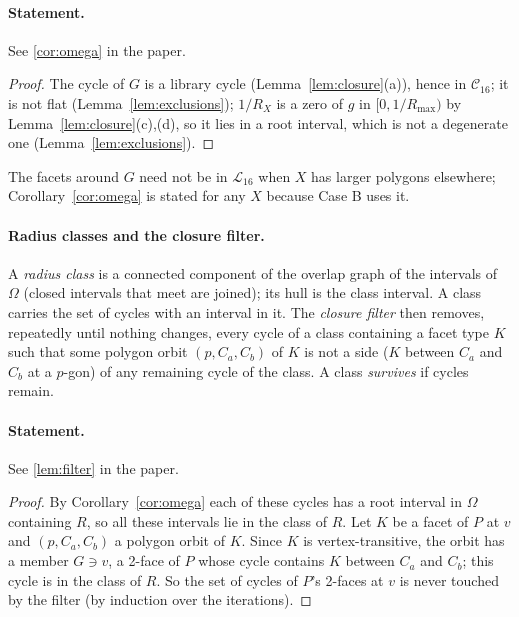 \documentclass[11pt]{article}
\theoremstyle{definition}
\theoremstyle{remark}
\begin{document}
\paragraph{Statement.} See \ref{cor:omega} in the paper.

\begin{proof}
The cycle of $G$ is a library cycle (Lemma~\ref{lem:closure}(a)), hence
in $\mathcal C_{16}$; it is not flat (Lemma~\ref{lem:exclusions});
$1/R_X$ is a zero of $g$ in $[0,1/R_{\max})$ by
Lemma~\ref{lem:closure}(c),(d), so it lies in a root interval, which is not
a degenerate one (Lemma~\ref{lem:exclusions}).
\end{proof}

The facets around $G$ need not be in $\mathcal L_{16}$ when $X$ has larger
polygons elsewhere; Corollary~\ref{cor:omega} is stated for any $X$
because Case B uses it.

\paragraph{Radius classes and the closure filter.}
A \emph{radius class} is a connected component of the overlap graph of
the intervals of $\Omega$ (closed intervals that meet are joined); its
hull is the class interval. A class carries the set of cycles with an
interval in it. The \emph{closure filter} then removes, repeatedly until
nothing changes, every cycle of a class containing a facet type $K$ such
that some polygon orbit $(p,C_a,C_b)$ of $K$ is not a side
($K$ between $C_a$ and $C_b$ at a $p$-gon) of any remaining cycle of the
class. A class \emph{survives} if cycles remain.

\paragraph{Statement.} See \ref{lem:filter} in the paper.

\begin{proof}
By Corollary~\ref{cor:omega} each of these cycles has a root interval in
$\Omega$ containing $R$, so all these intervals lie in the class of $R$.
Let $K$ be a facet of $P$ at $v$ and $(p,C_a,C_b)$ a polygon orbit of $K$.
Since $K$ is vertex-transitive, the orbit has a member $G\ni v$, a 2-face
of $P$ whose cycle contains $K$ between $C_a$ and $C_b$; this cycle is in
the class of $R$. So the set of cycles of $P$'s 2-faces at $v$ is never
touched by the filter (by induction over the iterations).
\end{proof}
\end{document}
